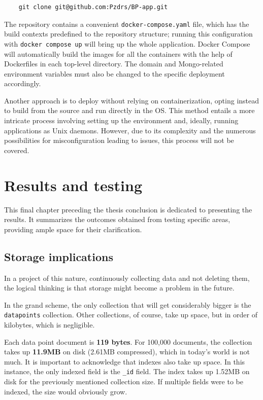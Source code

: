 \documentclass[FM,BP,EN,fonts]{tulthesis}
\begin{document}
\begin{verbatim}
    git clone git@github.com:Pzdrs/BP-app.git
\end{verbatim}

The repository contains a convenient \verb|docker-compose.yaml| file, which has the build contexts predefined to the repository structure; running this configuration with \verb|docker compose up| will bring up the whole application. Docker Compose will automatically build the images for all the containers with the help of Dockerfiles in each top-level directory. The domain and Mongo-related environment variables must also be changed to the specific deployment accordingly.

Another approach is to deploy without relying on containerization, opting instead to build from the source and run directly in the OS. This method entails a more intricate process involving setting up the environment and, ideally, running applications as Unix daemons. However, due to its complexity and the numerous possibilities for misconfiguration leading to issues, this process will not be covered.
\chapter{Results and testing}
\label{chap:results}
This final chapter preceding the thesis conclusion is dedicated to presenting the results. It summarizes the outcomes obtained from testing specific areas, providing ample space for their clarification.

\section{Storage implications}
\label{sec:storage-implications}
In a project of this nature, continuously collecting data and not deleting them, the logical thinking is that storage might become a problem in the future.

In the grand scheme, the only collection that will get considerably bigger is the \verb|datapoints| collection. Other collections, of course, take up space, but in order of kilobytes, which is negligible.

Each data point document is \textbf{119 bytes}. For 100,000 documents, the collection takes up \textbf{11.9MB} on disk (2.61MB compressed), which in today's world is not much. It is important to acknowledge that indexes also take up space. In this instance, the only indexed field is the \verb|_id| field. The index takes up 1.52MB on disk for the previously mentioned collection size. If multiple fields were to be indexed, the size would obviously grow.
\end{document}
